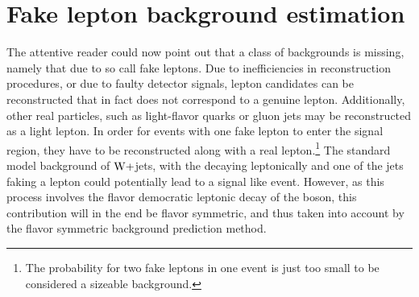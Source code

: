 \section{Fake lepton background estimation}
\noindent\justify
The attentive reader could now point out that a class of backgrounds is missing, namely that due to so call fake leptons. 
Due to inefficiencies in reconstruction procedures, or due to faulty detector signals, lepton candidates can be reconstructed that in fact does not correspond to a genuine lepton. 
Additionally, other real particles, such as light-flavor quarks or gluon jets may be reconstructed as a light lepton. 
In order for events with one fake lepton to enter the signal region, they have to be reconstructed along with a real lepton.\footnote{The probability for two fake leptons in one event is just too small to be considered a sizeable background.}
The standard model background of $\mathrm{W}+$jets, with the \PW decaying leptonically and one of the jets faking a lepton could potentially lead to a signal like event. 
However, as this process involves the flavor democratic leptonic decay of the \PW boson, this contribution will in the end be flavor symmetric, and thus taken into account by the flavor symmetric background prediction method.  


